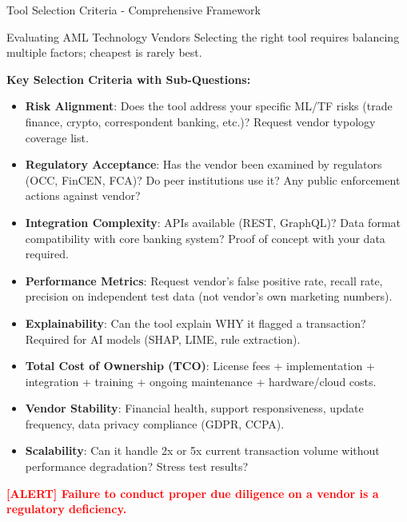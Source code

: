 \documentclass[11pt,a4paper]{beamer}
\newcommand{\redflag}[1]{\textcolor{red}{\textbf{[ALERT] #1}}}
\begin{document}
\begin{frame}{Tool Selection Criteria - Comprehensive Framework}
	\begin{block}{Evaluating AML Technology Vendors}
		Selecting the right tool requires balancing multiple factors; cheapest is rarely best.
	\end{block}
	\textbf{Key Selection Criteria with Sub-Questions:}
	\begin{itemize}
		\item \textbf{Risk Alignment}: Does the tool address your specific ML/TF risks (trade finance, crypto, correspondent banking, etc.)? Request vendor typology coverage list.
		\item \textbf{Regulatory Acceptance}: Has the vendor been examined by regulators (OCC, FinCEN, FCA)? Do peer institutions use it? Any public enforcement actions against vendor?
		\item \textbf{Integration Complexity}: APIs available (REST, GraphQL)? Data format compatibility with core banking system? Proof of concept with your data required.
		\item \textbf{Performance Metrics}: Request vendor's false positive rate, recall rate, precision on independent test data (not vendor's own marketing numbers).
		\item \textbf{Explainability}: Can the tool explain WHY it flagged a transaction? Required for AI models (SHAP, LIME, rule extraction).
		\item \textbf{Total Cost of Ownership (TCO)}: License fees + implementation + integration + training + ongoing maintenance + hardware/cloud costs.
		\item \textbf{Vendor Stability}: Financial health, support responsiveness, update frequency, data privacy compliance (GDPR, CCPA).
		\item \textbf{Scalability}: Can it handle 2x or 5x current transaction volume without performance degradation? Stress test results?
	\end{itemize}
	\redflag{Failure to conduct proper due diligence on a vendor is a regulatory deficiency.}
\end{frame}
\end{document}
